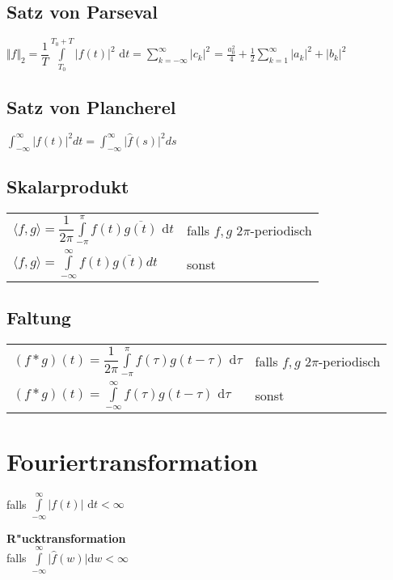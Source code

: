 \subsection{Satz von Parseval}

\( \displaystyle \Vert f \Vert_2
= \dfrac{1}{T} \int\limits_{T_0}^{T_0 + T} \vert f(t) \vert^2 \text{ d}t = \sum\limits_{k=-\infty}^\infty \vert c_k \vert^2 \) = $\frac{a_0^2}{4} + \frac{1}{2} \sum\limits_{k=1}^\infty |a_k|^2 + |b_k|^2$
\subsection{Satz von Plancherel}
$\int_{-\infty}^{\infty} \vert f(t) \vert^2 dt = \int_{-\infty}^{\infty} \vert \hat{f}(s) \vert^2 ds$


\subsection{Skalarprodukt}
\begin{tabular}{ll}
\( \langle f,g \rangle = \dfrac{1}{2\pi} \int\limits_{-\pi}^{\pi} f(t)\overline{g(t)} \text{ d}t \)
&	falls \(f, g\) \(2\pi\)-periodisch\\
\( \langle f,g \rangle = \int\limits_{-\infty}^\infty f(t) \overline{g(t)} dt \)
&	sonst
\end{tabular}

\subsection{Faltung}
\begin{tabular}{ll}
\( \displaystyle (f*g)(t) = \dfrac{1}{2\pi} \int\limits_{-\pi}^\pi f(\tau)g(t-\tau) \text{ d}\tau \)
&	falls \(f, g\) \(2\pi\)-periodisch\\
\( \displaystyle (f*g)(t) = \int\limits_{-\infty}^\infty f(\tau)g(t-\tau) \text{ d}\tau \)
&	sonst
\end{tabular}
\section{Fouriertransformation}
\quad falls \( \int\limits_{-\infty}^\infty \vert f(t) \vert \text{ d}t < \infty \)

\textbf{R"ucktransformation}\\
falls \( \int\limits_{-\infty}^\infty \vert \widehat{f}(w) \vert \text{d}w < \infty \)

